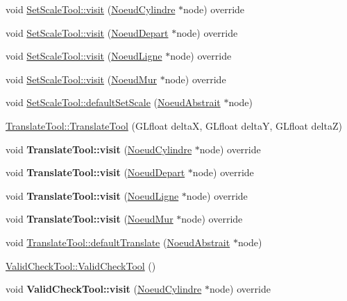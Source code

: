 \begin{DoxyCompactItemize}
\item 
void \hyperlink{group__inf2990_gae12ec27e420078166d0f1fbce51ea3c1}{Set\+Scale\+Tool\+::visit} (\hyperlink{class_noeud_cylindre}{Noeud\+Cylindre} $\ast$node) override
\item 
void \hyperlink{group__inf2990_ga372ff3eab42997c84eb768fdf72a5dcc}{Set\+Scale\+Tool\+::visit} (\hyperlink{class_noeud_depart}{Noeud\+Depart} $\ast$node) override
\item 
void \hyperlink{group__inf2990_ga5ee39e2a3ccf356b094e692d43beecb8}{Set\+Scale\+Tool\+::visit} (\hyperlink{class_noeud_ligne}{Noeud\+Ligne} $\ast$node) override
\item 
void \hyperlink{group__inf2990_ga51cfb7f08b02858b45b2beb9e51a8dce}{Set\+Scale\+Tool\+::visit} (\hyperlink{class_noeud_mur}{Noeud\+Mur} $\ast$node) override
\item 
void \hyperlink{group__inf2990_ga589b51975cc03cea1752747ef558a45d}{Set\+Scale\+Tool\+::default\+Set\+Scale} (\hyperlink{class_noeud_abstrait}{Noeud\+Abstrait} $\ast$node)
\item 
\hyperlink{group__inf2990_ga48e1c155fef64a5a07991df870721ae6}{Translate\+Tool\+::\+Translate\+Tool} (G\+Lfloat delta\+X, G\+Lfloat delta\+Y, G\+Lfloat delta\+Z)
\item 
\hypertarget{group__inf2990_ga64811cbd57db1cb725dc0d472c8f5ab1}{}void {\bfseries Translate\+Tool\+::visit} (\hyperlink{class_noeud_cylindre}{Noeud\+Cylindre} $\ast$node) override\label{group__inf2990_ga64811cbd57db1cb725dc0d472c8f5ab1}

\item 
\hypertarget{group__inf2990_gab0781475ac48f2dcb8610bfee475aba3}{}void {\bfseries Translate\+Tool\+::visit} (\hyperlink{class_noeud_depart}{Noeud\+Depart} $\ast$node) override\label{group__inf2990_gab0781475ac48f2dcb8610bfee475aba3}

\item 
\hypertarget{group__inf2990_ga2df7046e6e0a6f3e5215b7326d349f5d}{}void {\bfseries Translate\+Tool\+::visit} (\hyperlink{class_noeud_ligne}{Noeud\+Ligne} $\ast$node) override\label{group__inf2990_ga2df7046e6e0a6f3e5215b7326d349f5d}

\item 
\hypertarget{group__inf2990_ga7172d03575c6b5062c61753f8d0bce08}{}void {\bfseries Translate\+Tool\+::visit} (\hyperlink{class_noeud_mur}{Noeud\+Mur} $\ast$node) override\label{group__inf2990_ga7172d03575c6b5062c61753f8d0bce08}

\item 
void \hyperlink{group__inf2990_ga1e47597de16ebba1986441232607d6dc}{Translate\+Tool\+::default\+Translate} (\hyperlink{class_noeud_abstrait}{Noeud\+Abstrait} $\ast$node)
\item 
\hyperlink{group__inf2990_ga4e827b025969ce7fa8204c6a62cf27c6}{Valid\+Check\+Tool\+::\+Valid\+Check\+Tool} ()
\item 
\hypertarget{group__inf2990_ga032c8fa96e75b6300ce0ad8692250c0c}{}void {\bfseries Valid\+Check\+Tool\+::visit} (\hyperlink{class_noeud_cylindre}{Noeud\+Cylindre} $\ast$node) override\label{group__inf2990_ga032c8fa96e75b6300ce0ad8692250c0c}


\end{DoxyCompactItemize}
